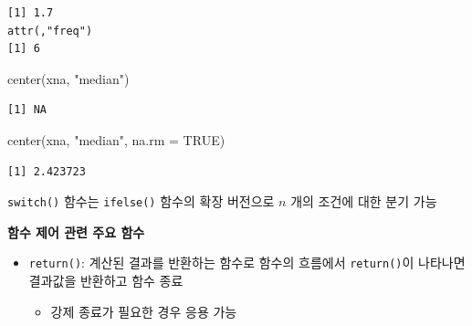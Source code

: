 \documentclass[
  11pt,
]{krantz}
\makeatletter
\newenvironment{Shaded}{\begin{snugshade}}{\end{snugshade}}
\newcommand{\AttributeTok}[1]{\textcolor[rgb]{0.61,0.61,0.61}{#1}}
\newcommand{\ConstantTok}[1]{\textcolor[rgb]{0,0,0}{#1}}
\newcommand{\FunctionTok}[1]{\textcolor[rgb]{0,0,0}{#1}}
\newcommand{\NormalTok}[1]{#1}
\newcommand{\StringTok}[1]{\textcolor[rgb]{0.5,0.5,0.5}{#1}}
\providecommand{\tightlist}{%
  \setlength{\itemsep}{0pt}\setlength{\parskip}{0pt}}
\newenvironment{kframe}{%
\medskip{}
\setlength{\fboxsep}{.8em}
 \def\at@end@of@kframe{}%
 \ifinner\ifhmode%
  \def\at@end@of@kframe{\end{minipage}}%
  \begin{minipage}{\columnwidth}%
 \fi\fi%
 \def\FrameCommand##1{\hskip\@totalleftmargin \hskip-\fboxsep
 \colorbox{shadecolor}{##1}\hskip-\fboxsep
     \hskip-\linewidth \hskip-\@totalleftmargin \hskip\columnwidth}%
 \MakeFramed {\advance\hsize-\width
   \@totalleftmargin\z@ \linewidth\hsize
   \@setminipage}}%
 {\par\unskip\endMakeFramed%
 \at@end@of@kframe}
\newenvironment{rmdblock}[1]
  {
  \begin{itemize}
  \renewcommand{\labelitemi}{
    \raisebox{-.7\height}[0pt][0pt]{
      {\setkeys{Gin}{width=3em,keepaspectratio}\texttt{[image: images/\#1]}}
    }
  }
  \setlength{\fboxsep}{1em}
  \begin{kframe}
  \item
  }
  {
  \end{kframe}
  \end{itemize}
  }
\newenvironment{rmdnote}
  {\begin{rmdblock}{note}}
  {\end{rmdblock}}
\makeatother
\begin{document}
\begin{verbatim}
[1] 1.7
attr(,"freq")
[1] 6
\end{verbatim}

\begin{Shaded}
\begin{Highlighting}[]
\FunctionTok{center}\NormalTok{(xna, }\StringTok{"median"}\NormalTok{)}
\end{Highlighting}
\end{Shaded}

\begin{verbatim}
[1] NA
\end{verbatim}

\begin{Shaded}
\begin{Highlighting}[]
\FunctionTok{center}\NormalTok{(xna, }\StringTok{"median"}\NormalTok{, }\AttributeTok{na.rm =} \ConstantTok{TRUE}\NormalTok{)}
\end{Highlighting}
\end{Shaded}

\begin{verbatim}
[1] 2.423723
\end{verbatim}

\normalsize

\footnotesize

\begin{rmdnote}
\texttt{switch()} 함수는 \texttt{ifelse()} 함수의 확장 버전으로 \(n\) 개의 조건에 대한 분기 가능
\end{rmdnote}

\normalsize

\textbf{함수 제어 관련 주요 함수}

\begin{itemize}
\tightlist
\item
  \texttt{return()}: 계산된 결과를 반환하는 함수로 함수의 흐름에서 \texttt{return()}이 나타나면 결과값을 반환하고 함수 종료

  \begin{itemize}
  \tightlist
  \item
    강제 종료가 필요한 경우 응용 가능
  \end{itemize}
\end{itemize}

\footnotesize
\end{document}
